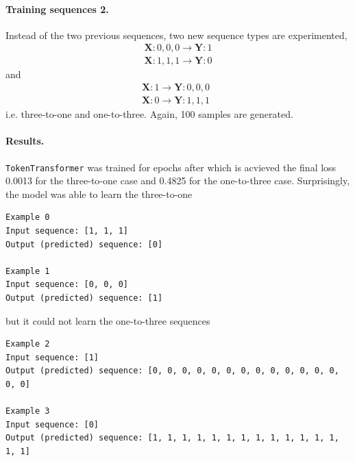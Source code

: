 \documentclass[final]{article}
\begin{document}
\paragraph{Training sequences 2.} Instead of the two previous
sequences, two new sequence types are experimented,
\begin{displaymath}
  \begin{split}
    \mathbf{X}: 0,0,0 \rightarrow \mathbf{Y}: 1\\
    \mathbf{X}: 1,1,1 \rightarrow \mathbf{Y}: 0
  \end{split}
\end{displaymath}
and
\begin{displaymath}
  \begin{split}
    \mathbf{X}: 1 \rightarrow \mathbf{Y}: 0, 0, 0\\
    \mathbf{X}: 0 \rightarrow \mathbf{Y}: 1, 1, 1
  \end{split} \enspace
\end{displaymath}
i.e. three-to-one and one-to-three. Again, 100 samples are generated.

\paragraph{Results.}
\texttt{TokenTransformer} was trained for epochs after which is acvieved the final loss 0.0013 for the three-to-one case and 0.4825 for the one-to-three case. Surprisingly, the model was able to learn the three-to-one
\begin{verbatim}
Example 0
Input sequence: [1, 1, 1]
Output (predicted) sequence: [0]

Example 1
Input sequence: [0, 0, 0]
Output (predicted) sequence: [1]
\end{verbatim}
but it could not learn the one-to-three sequences
\begin{verbatim}
Example 2
Input sequence: [1]
Output (predicted) sequence: [0, 0, 0, 0, 0, 0, 0, 0, 0, 0, 0, 0, 0, 0, 0]

Example 3
Input sequence: [0]
Output (predicted) sequence: [1, 1, 1, 1, 1, 1, 1, 1, 1, 1, 1, 1, 1, 1, 1]
\end{verbatim}
\end{document}
